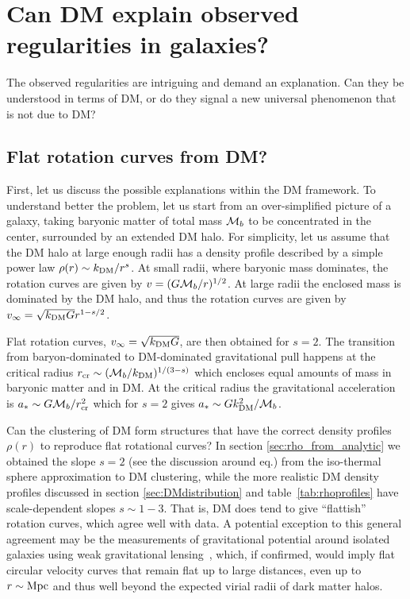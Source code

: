 \section{Can DM explain observed regularities in galaxies?}
The observed regularities are intriguing and demand an explanation. 
Can they be understood in terms of DM, or do they signal a new universal phenomenon that is not due to DM?


\subsection{Flat rotation curves from DM?}
First, let us discuss the possible explanations within the DM framework. 
To understand better the problem, let us start from an over-simplified picture of a galaxy, taking
 baryonic matter of total mass ${\cal M}_b$ to be concentrated in the center, surrounded by an extended DM halo. For simplicity, let us assume that the DM halo at large enough radii has a density profile described by a simple power law
$\rho(r) \sim k_{\rm DM}/r^s$.
 At small radii, where baryonic mass dominates,  the rotation curves are given by $v = (G {\cal M}_b/r)^{1/2}$. At large radii the enclosed mass is dominated by the DM halo, and thus the rotation curves are given by 
 $v_\infty= \sqrt{k_{\rm DM} G} r^{1-s/2}$. 
 
 Flat rotation curves, $v_\infty= \sqrt{k_{\rm DM} G}$, are then obtained for $s=2$.
The transition from baryon-dominated to DM-dominated gravitational pull happens  
at the critical radius $r_{\rm cr}\sim ({\cal M}_b/k_{\rm DM})^{1/(3-s)}$ 
which encloses equal amounts of mass in baryonic matter and in DM.
At the critical radius the gravitational acceleration is $a_*\sim G{\cal M}_b/r_{\rm cr}^2$ which for $s=2$ gives 
$a_*\sim G k_{\rm DM}^2/{\cal M}_b $. 


Can the clustering of DM form structures that have the correct density profiles $\rho(r)$ to reproduce flat rotational curves?
In section \ref{sec:rho_from_analytic} we obtained the slope $s=2$ (see the discussion around eq.) from the iso-thermal sphere
approximation to DM clustering, while the more realistic
DM density profiles discussed in section \ref{sec:DMdistribution} and
table~\ref{tab:rhoprofiles} have scale-dependent slopes $s\sim 1-3$.
That is,  DM does tend to give ``flattish'' rotation curves, which agree well with data. A potential exception to this general agreement may be the measurements of gravitational potential around isolated galaxies using weak gravitational lensing~\cite{2406.09685}, which, if confirmed, would imply flat circular velocity curves that remain flat  
up to large distances, even up to $r\sim {\rm Mpc}$ and thus well beyond the expected virial radii of dark matter halos.


